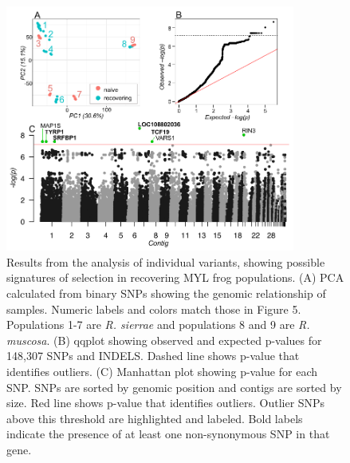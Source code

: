 \documentclass[9pt,twoside,lineno]{pnas-new-SI}
\begin{document}
\begin{figure}

{\centering \includegraphics[width=0.85\textwidth]{figures/pca_qq_manhattan.png}

}

\caption{\label{fig-selectionresults}Results from the analysis of
individual variants, showing possible signatures of selection in
recovering MYL frog populations. (A) PCA calculated from binary SNPs
showing the genomic relationship of samples. Numeric labels and colors
match those in Figure 5. Populations 1-7 are
\emph{R. sierrae} and populations 8 and 9 are \emph{R. muscosa}. (B)
qqplot showing observed and expected p-values for 148,307 SNPs and
INDELS. Dashed line shows p-value that identifies outliers. (C)
Manhattan plot showing p-value for each SNP. SNPs are sorted by genomic
position and contigs are sorted by size. Red line shows p-value that
identifies outliers. Outlier SNPs above this threshold are highlighted
and labeled. Bold labels indicate the presence of at least one
non-synonymous SNP in that gene.}

\end{figure}\clearpage

\newpage
\end{document}
